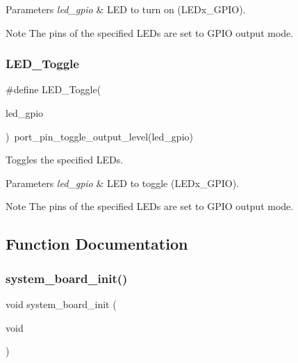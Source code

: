 \begin{DoxyParams}{Parameters}
{\em led\+\_\+gpio} & L\+ED to turn on (L\+E\+Dx\+\_\+\+G\+P\+IO).\\
\hline
\end{DoxyParams}
\begin{DoxyNote}{Note}
The pins of the specified L\+E\+Ds are set to G\+P\+IO output mode. 
\end{DoxyNote}
\mbox{\label{group__samd21__xplained__pro__group_gac66f7ba408e0f06c78db8b3048126c8e}} 
\subsubsection{\texorpdfstring{LED\_Toggle}{LED\_Toggle}}
{\footnotesize\ttfamily \#define L\+E\+D\+\_\+\+Toggle(\begin{DoxyParamCaption}\item[{}]{led\+\_\+gpio }\end{DoxyParamCaption})~port\+\_\+pin\+\_\+toggle\+\_\+output\+\_\+level(led\+\_\+gpio)}



Toggles the specified L\+E\+Ds. 


\begin{DoxyParams}{Parameters}
{\em led\+\_\+gpio} & L\+ED to toggle (L\+E\+Dx\+\_\+\+G\+P\+IO).\\
\hline
\end{DoxyParams}
\begin{DoxyNote}{Note}
The pins of the specified L\+E\+Ds are set to G\+P\+IO output mode. 
\end{DoxyNote}


\subsection{Function Documentation}
\mbox{\label{group__samd21__xplained__pro__group_gae25f520a05ec8f10b092636516e63c0e}} 
\subsubsection{\texorpdfstring{system\_board\_init()}{system\_board\_init()}}
{\footnotesize\ttfamily void system\+\_\+board\+\_\+init (\begin{DoxyParamCaption}\item[{void}]{ }\end{DoxyParamCaption})}

